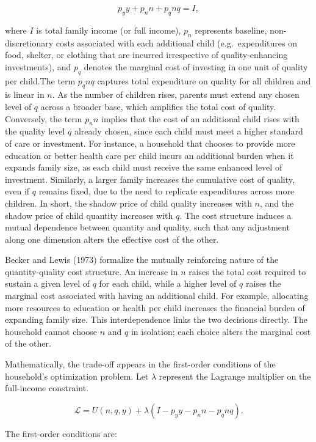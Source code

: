 \documentclass[]{AEA}
\begin{document}
\[
p_y y + p_n n + p_q n q = I,
\]

where \(I\) is total family income (or full income), \(p_n\) represents
baseline, non-discretionary costs associated with each additional child
(e.g.~expenditures on food, shelter, or clothing that are incurred
irrespective of quality-enhancing investments), and \(p_q\) denotes the
marginal cost of investing in one unit of quality per child.The term
\(p_q n q\) captures total expenditure on quality for all children and
is linear in \(n\). As the number of children rises, parents must extend
any chosen level of \(q\) across a broader base, which amplifies the
total cost of quality. Conversely, the term \(p_n n\) implies that the
cost of an additional child rises with the quality level \(q\) already
chosen, since each child must meet a higher standard of care or
investment. For instance, a household that chooses to provide more
education or better health care per child incurs an additional burden
when it expands family size, as each child must receive the same
enhanced level of investment. Similarly, a larger family increases the
cumulative cost of quality, even if \(q\) remains fixed, due to the need
to replicate expenditures across more children. In short, the shadow
price of child quality increases with \(n\), and the shadow price of
child quantity increases with \(q\). The cost structure induces a mutual
dependence between quantity and quality, such that any adjustment along
one dimension alters the effective cost of the other.

Becker and Lewis (1973) formalize the mutually reinforcing nature of the
quantity-quality cost structure. An increase in \(n\) raises the total
cost required to sustain a given level of \(q\) for each child, while a
higher level of \(q\) raises the marginal cost associated with having an
additional child. For example, allocating more resources to education or
health per child increases the financial burden of expanding family
size. This interdependence links the two decisions directly. The
household cannot choose \(n\) and \(q\) in isolation; each choice alters
the marginal cost of the other.

Mathematically, the trade-off appears in the first-order conditions of
the household's optimization problem. Let \(\lambda\) represent the
Lagrange multiplier on the full-income constraint.

\[
\mathcal{L} = U(n, q, y) + \lambda \left( I - p_y y - p_n n - p_q n q \right).
\]

The first-order conditions are:
\end{document}
